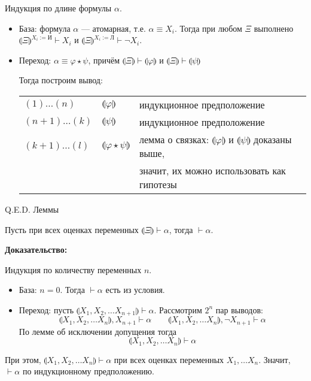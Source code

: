 Индукция по длине формулы $\alpha$.
\begin{itemize}
\item База: формула $\alpha$ --- атомарная, т.е. $\alpha \equiv X_i$. Тогда при любом $\Xi$ выполнено 
$\llparenthesis\Xi\rrparenthesis^{X_i := \text{И}} \vdash X_i$ и $\llparenthesis\Xi\rrparenthesis^{X_i := \text{Л}} \vdash \neg X_i$.
\item Переход: $\alpha \equiv \varphi\star\psi$, причём $\llparenthesis\Xi\rrparenthesis\vdash\llparenthesis\varphi\rrparenthesis$
и $\llparenthesis\Xi\rrparenthesis\vdash\llparenthesis\psi\rrparenthesis$

Тогда построим вывод: 

\begin{tabular}{lll}
$(1)\dots(n)$ & $\llparenthesis\varphi\rrparenthesis$ & индукционное предположение\\
$(n+1)\dots(k)$ & $\llparenthesis\psi\rrparenthesis$ & индукционное предположение\\
$(k+1)\dots(l)$ & $\llparenthesis\varphi\star\psi\rrparenthesis$ & 
  лемма о связках: $\llparenthesis\varphi\rrparenthesis$ и $\llparenthesis\psi\rrparenthesis$ доказаны выше,\\
  & & значит, их можно использовать как гипотезы
\end{tabular}
\end{itemize}

\hfill Q.E.D. Леммы


\begin{lemmarus}Пусть при всех оценках переменных
$\llparenthesis\Xi\rrparenthesis \vdash \alpha$, тогда
$\vdash\alpha$.
\end{lemmarus}

\textbf{Доказательство:}

Индукция по количеству переменных $n$.

\begin{itemize}
\item База: $n=0$. Тогда $\vdash\alpha$ есть из условия.
\item Переход: пусть $\llparenthesis X_1, X_2,  \dots X_{n+1} \rrparenthesis \vdash \alpha$.
Рассмотрим $2^n$ пар выводов: $$\llparenthesis X_1, X_2, \dots X_n\rrparenthesis,X_{n+1} \vdash \alpha\quad\quad\llparenthesis X_1, X_2, \dots X_n\rrparenthesis,\neg X_{n+1} \vdash \alpha$$
По лемме об исключении допущения тогда
$$\llparenthesis X_1, X_2, \dots X_n \rrparenthesis \vdash \alpha$$
\end{itemize}
При этом, $\llparenthesis X_1, X_2, \dots X_n \rrparenthesis  \vdash \alpha$ при всех оценках
переменных $X_1, \dots X_n$. Значит, $\vdash\alpha$ по индукционному предположению.

